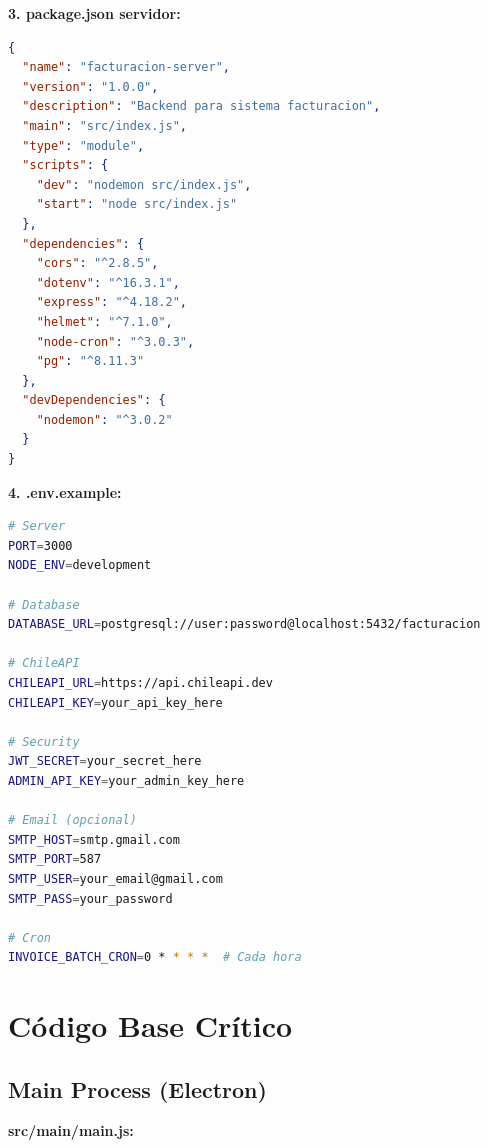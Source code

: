 \documentclass[11pt,a4paper]{article}
\begin{document}
\textbf{3. package.json servidor:}

\begin{lstlisting}[language=JSON]
{
  "name": "facturacion-server",
  "version": "1.0.0",
  "description": "Backend para sistema facturacion",
  "main": "src/index.js",
  "type": "module",
  "scripts": {
    "dev": "nodemon src/index.js",
    "start": "node src/index.js"
  },
  "dependencies": {
    "cors": "^2.8.5",
    "dotenv": "^16.3.1",
    "express": "^4.18.2",
    "helmet": "^7.1.0",
    "node-cron": "^3.0.3",
    "pg": "^8.11.3"
  },
  "devDependencies": {
    "nodemon": "^3.0.2"
  }
}
\end{lstlisting}

\textbf{4. .env.example:}

\begin{lstlisting}[language=bash]
# Server
PORT=3000
NODE_ENV=development

# Database
DATABASE_URL=postgresql://user:password@localhost:5432/facturacion

# ChileAPI
CHILEAPI_URL=https://api.chileapi.dev
CHILEAPI_KEY=your_api_key_here

# Security
JWT_SECRET=your_secret_here
ADMIN_API_KEY=your_admin_key_here

# Email (opcional)
SMTP_HOST=smtp.gmail.com
SMTP_PORT=587
SMTP_USER=your_email@gmail.com
SMTP_PASS=your_password

# Cron
INVOICE_BATCH_CRON=0 * * * *  # Cada hora
\end{lstlisting}

\newpage

\section{Código Base Crítico}

\subsection{Main Process (Electron)}

\textbf{src/main/main.js:}
\end{document}
